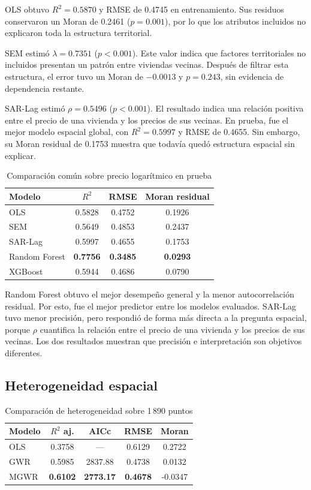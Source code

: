 \documentclass[conference]{IEEEtran}
\begin{document}
OLS obtuvo $R^2=0.5870$ y RMSE de 0.4745 en entrenamiento. Sus residuos conservaron un Moran de 0.2461 ($p=0.001$), por lo que los atributos incluidos no explicaron toda la estructura territorial.

SEM estimó $\lambda=0.7351$ ($p<0.001$). Este valor indica que factores territoriales no incluidos presentan un patrón entre viviendas vecinas. Después de filtrar esta estructura, el error tuvo un Moran de $-0.0013$ y $p=0.243$, sin evidencia de dependencia restante.

SAR-Lag estimó $\rho=0.5496$ ($p<0.001$). El resultado indica una relación positiva entre el precio de una vivienda y los precios de sus vecinas. En prueba, fue el mejor modelo espacial global, con $R^2=0.5997$ y RMSE de 0.4655. Sin embargo, su Moran residual de 0.1753 muestra que todavía quedó estructura espacial sin explicar.

\begin{table}[!t]
\caption{Comparación común sobre precio logarítmico en prueba}
\label{tab:global}
\centering
\begin{tabular}{lccc}
\toprule
Modelo & $R^2$ & RMSE & Moran residual\\
\midrule
OLS & 0.5828 & 0.4752 & 0.1926\\
SEM & 0.5649 & 0.4853 & 0.2437\\
SAR-Lag & 0.5997 & 0.4655 & 0.1753\\
Random Forest & \textbf{0.7756} & \textbf{0.3485} & \textbf{0.0293}\\
XGBoost & 0.5944 & 0.4686 & 0.0790\\
\bottomrule
\end{tabular}
\end{table}

Random Forest obtuvo el mejor desempeño general y la menor autocorrelación residual. Por esto, fue el mejor predictor entre los modelos evaluados. SAR-Lag tuvo menor precisión, pero respondió de forma más directa a la pregunta espacial, porque $\rho$ cuantifica la relación entre el precio de una vivienda y los precios de sus vecinas. Los dos resultados muestran que precisión e interpretación son objetivos diferentes.

\subsection{Heterogeneidad espacial}

\begin{table}[!t]
\caption{Comparación de heterogeneidad sobre 1\,890 puntos}
\label{tab:heterogeneity}
\centering
\begin{tabular}{lcccc}
\toprule
Modelo & $R^2$ aj. & AICc & RMSE & Moran\\
\midrule
OLS & 0.3758 & --- & 0.6129 & 0.2722\\
GWR & 0.5985 & 2837.88 & 0.4738 & 0.0132\\
MGWR & \textbf{0.6102} & \textbf{2773.17} & \textbf{0.4678} & -0.0347\\
\bottomrule
\end{tabular}
\end{table}
\end{document}
